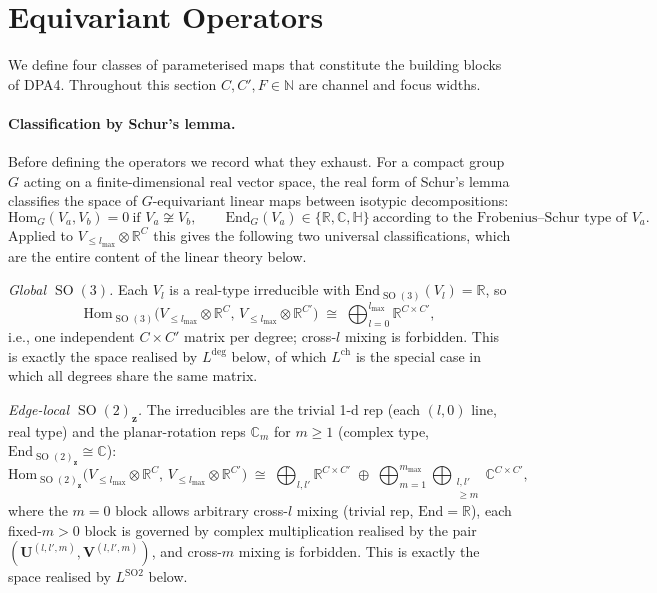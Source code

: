 \documentclass[11pt,a4paper]{article}
\DeclareMathOperator{\SO}{SO}
\newcommand{\R}{\mathbb{R}}
\newcommand{\N}{\mathbb{N}}
\newcommand{\C}{\mathbb{C}}
\newcommand{\bU}{\bm{U}}
\newcommand{\bV}{\bm{V}}
\newcommand{\bz}{\bm{z}}
\newcommand{\lmax}{l_{\max}}
\newcommand{\mmax}{m_{\max}}
\theoremstyle{plain}
\theoremstyle{definition}
\theoremstyle{remark}
\begin{document}
\section{Equivariant Operators}\label{sec:ops}

We define four classes of parameterised maps that constitute the building
blocks of DPA4. Throughout this section $C,C',F\in\N$ are channel and focus
widths.

\paragraph{Classification by Schur's lemma.}
Before defining the operators we record what they exhaust. For a compact group
$G$ acting on a finite-dimensional real vector space, the real form of Schur's
lemma classifies the space of $G$-equivariant linear maps between isotypic
decompositions:
\[
    \mathrm{Hom}_G(V_a,V_b)=0\ \text{if }V_a\not\cong V_b,\qquad
    \mathrm{End}_G(V_a)\in\{\R,\C,\mathbb{H}\}\ \text{according to the Frobenius--Schur type of }V_a.
\]
Applied to $V_{\le\lmax}\otimes\R^C$ this gives the following two universal
classifications, which are the entire content of the linear theory below.

\emph{Global $\SO(3)$.} Each $V_l$ is a real-type irreducible with $\mathrm{End}_{\SO(3)}(V_l)=\R$, so
\begin{equation}\label{eq:hom-so3}
    \mathrm{Hom}_{\SO(3)}\bigl(V_{\le\lmax}\otimes\R^C,\,V_{\le\lmax}\otimes\R^{C'}\bigr)\;\cong\;\bigoplus_{l=0}^{\lmax}\R^{C\times C'},
\end{equation}
i.e., one independent $C\times C'$ matrix per degree; cross-$l$ mixing is forbidden.
This is exactly the space realised by $L^{\mathrm{deg}}$ below, of which $L^{\mathrm{ch}}$ is the special case in which all degrees share the same matrix.

\emph{Edge-local $\SO(2)_{\bz}$.} The irreducibles are the trivial 1-d rep (each $(l,0)$ line, real type) and the planar-rotation reps $\C_m$ for $m\ge 1$ (complex type, $\mathrm{End}_{\SO(2)_{\bz}}\cong\C$):
    \begin{equation}\label{eq:hom-so2}
        \mathrm{Hom}_{\SO(2)_{\bz}}\bigl(V_{\le\lmax}\otimes\R^C,\,V_{\le\lmax}\otimes\R^{C'}\bigr)\;\cong\;
        \bigoplus_{l,l'}\R^{C\times C'}\;\oplus\;\bigoplus_{m=1}^{\mmax}\!\bigoplus_{\substack{l,l'\\\geq m}}\C^{C\times C'},
    \end{equation}
    where the $m=0$ block allows arbitrary cross-$l$ mixing (trivial rep, $\mathrm{End}=\R$), each fixed-$m>0$ block is governed by complex multiplication realised by the pair $(\bU^{(l,l',m)},\bV^{(l,l',m)})$, and cross-$m$ mixing is forbidden.
    This is exactly the space realised by $L^{\mathrm{SO2}}$ below.
\end{document}
